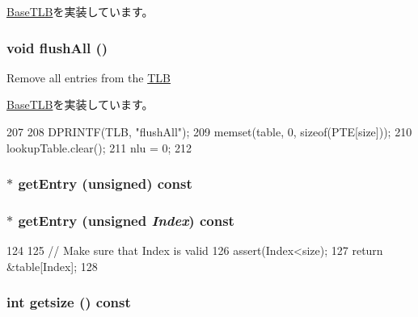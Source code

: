 \hyperlink{classBaseTLB_a5958bc92949a47d1be1088468abdc006}{BaseTLB}を実装しています。\hypertarget{classMipsISA_1_1TLB_aca1483a67aee5a91e442f7131d66bcbd}{
\subsubsection[{flushAll}]{\setlength{\rightskip}{0pt plus 5cm}void flushAll ()}}
\label{classMipsISA_1_1TLB_aca1483a67aee5a91e442f7131d66bcbd}
Remove all entries from the \hyperlink{classMipsISA_1_1TLB}{TLB} 

\hyperlink{classBaseTLB_a5958bc92949a47d1be1088468abdc006}{BaseTLB}を実装しています。


\begin{DoxyCode}
207 {
208     DPRINTF(TLB, "flushAll\n");
209     memset(table, 0, sizeof(PTE[size]));
210     lookupTable.clear();
211     nlu = 0;
212 }
\end{DoxyCode}
\hypertarget{classMipsISA_1_1TLB_a2e0dd0d3ac6f571bfabd82a121e065af}{
\subsubsection[{getEntry}]{$\ast$ getEntry (unsigned) const}}
\label{classMipsISA_1_1TLB_a2e0dd0d3ac6f571bfabd82a121e065af}
\hypertarget{classMipsISA_1_1TLB_a037665357bdcc33c860434de97a7e439}{
\subsubsection[{getEntry}]{ $\ast$ getEntry (unsigned {\em Index}) const}}
\label{classMipsISA_1_1TLB_a037665357bdcc33c860434de97a7e439}



\begin{DoxyCode}
124 {
125     // Make sure that Index is valid
126     assert(Index<size);
127     return &table[Index];
128 }
\end{DoxyCode}
\hypertarget{classMipsISA_1_1TLB_ae121404a6cfcf714e05fe2231ce4c7fc}{
\subsubsection[{getsize}]{\setlength{\rightskip}{0pt plus 5cm}int getsize () const}}
\label{classMipsISA_1_1TLB_ae121404a6cfcf714e05fe2231ce4c7fc}




